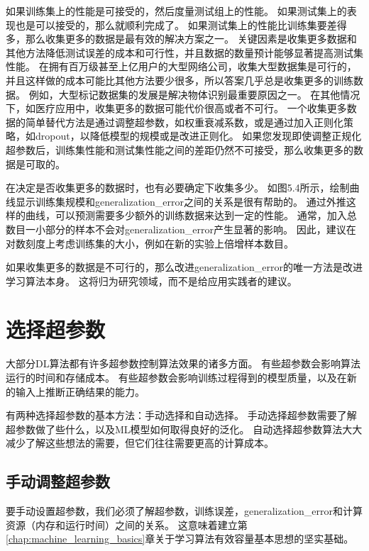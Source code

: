
如果训练集上的性能是可接受的，然后度量测试组上的性能。
如果测试集上的表现也是可以接受的，那么就顺利完成了。
如果测试集上的性能比训练集要差得多，那么收集更多的数据是最有效的解决方案之一。
关键因素是收集更多数据和其他方法降低测试误差的成本和可行性，并且数据的数量预计能够显著提高测试集性能。
在拥有百万级甚至上亿用户的大型网络公司，收集大型数据集是可行的，并且这样做的成本可能比其他方法要少很多，所以答案几乎总是收集更多的训练数据。
例如，大型标记数据集的发展是解决物体识别最重要原因之一。
在其他情况下，如医疗应用中，收集更多的数据可能代价很高或者不可行。
一个收集更多数据的简单替代方法是通过调整超参数，如权重衰减系数，或是通过加入正则化策略，如\gls{dropout}，以降低模型的规模或是改进正则化。
如果您发现即使调整正规化超参数后，训练集性能和测试集性能之间的差距仍然不可接受，那么收集更多的数据是可取的。

在决定是否收集更多的数据时，也有必要确定下收集多少。
如图5.4所示，绘制曲线显示训练集规模和\gls{generalization_error}之间的关系是很有帮助的。
通过外推这样的曲线，可以预测需要多少额外的训练数据来达到一定的性能。
通常，加入总数目一小部分的样本不会对\gls{generalization_error}产生显著的影响。
因此，建议在对数刻度上考虑训练集的大小，例如在新的实验上倍增样本数目。

如果收集更多的数据是不可行的，那么改进\gls{generalization_error}的唯一方法是改进学习算法本身。
这将归为研究领域，而不是给应用实践者的建议。

\section{选择超参数}
\label{sec:selecting_hyperparameters}
大部分\gls{DL}算法都有许多超参数控制算法效果的诸多方面。
有些超参数会影响算法运行的时间和存储成本。
有些超参数会影响训练过程得到的模型质量，以及在新的输入上推断正确结果的能力。


有两种选择超参数的基本方法：手动选择和自动选择。
手动选择超参数需要了解超参数做了些什么，以及\gls{ML}模型如何取得良好的泛化。
自动选择超参数算法大大减少了解这些想法的需要，但它们往往需要更高的计算成本。

\subsection{手动调整超参数}
\label{subsec:manual_hyperparameter_tuning}
要手动设置超参数，我们必须了解超参数，训练误差，\gls{generalization_error}和计算资源（内存和运行时间）之间的关系。
这意味着建立第\ref{chap:machine_learning_basics}章关于学习算法有效容量基本思想的坚实基础。

